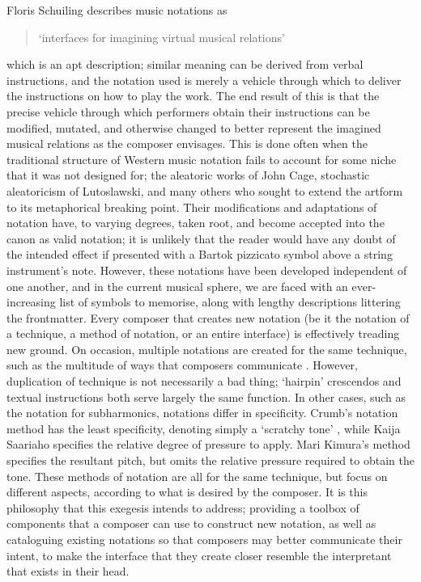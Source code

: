 Floris Schuiling describes music notations as \begin{quotation}
`interfaces for imagining virtual musical relations'
\end{quotation}
which is an apt description; similar meaning can be derived from verbal instructions, and the notation used is merely a vehicle through which to deliver the instructions on how to play the work.
The end result of this is that the precise vehicle through which performers obtain their instructions can be modified, mutated, and otherwise changed to better represent the imagined musical relations as the composer envisages.
This is done often when the traditional structure of Western music notation fails to account for some niche that it was not designed for; the aleatoric works of John Cage, stochastic aleatoricism of Lutoslawski, and many others who sought to extend the artform to its metaphorical breaking point.
Their modifications and adaptations of notation have, to varying degrees, taken root, and become accepted into the canon as valid notation; it is unlikely that the reader would have any doubt of the intended effect if presented with a Bartok pizzicato symbol above a string instrument's note.
However, these notations have been developed independent of one another, and in the current musical sphere, we are faced with an ever-increasing list of symbols to memorise, along with lengthy descriptions littering the frontmatter.
Every composer that creates new notation (be it the notation of a technique, a method of notation, or an entire interface) is effectively treading new ground.
On occasion, multiple notations are created for the same technique, such as the multitude of ways that composers communicate .
However, duplication of technique is not necessarily a bad thing; `hairpin' crescendos and textual instructions both serve largely the same function.
In other cases, such as the notation for  subharmonics, notations differ in specificity. 
Crumb's notation method has the least specificity, denoting simply a `scratchy tone' , while Kaija Saariaho specifies the relative degree of pressure to apply.
Mari Kimura's method specifies the resultant pitch, but omits the relative pressure required to obtain the tone.
These methods of notation are all for the same technique, but focus on different aspects, according to what is desired by the composer.
It is this philosophy that this exegesis intends to address; 
providing a toolbox of components that a composer can use to construct new notation, as well as cataloguing existing notations so that composers may better communicate their intent, to make the interface that they create closer resemble the interpretant that exists in their head.

